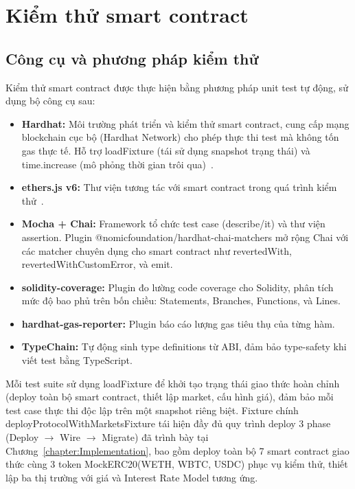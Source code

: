 \documentclass[../DoAn.tex]{subfiles}
\begin{document}
\section{Kiểm thử smart contract}


\subsection{Công cụ và phương pháp kiểm thử}


Kiểm thử smart contract được thực hiện bằng phương pháp unit test tự động, sử dụng bộ công cụ sau:

\begin{itemize}
  \item \textbf{Hardhat:} Môi trường phát triển và kiểm thử smart contract, cung cấp mạng blockchain cục bộ (Hardhat Network) cho phép thực thi test mà không tốn gas thực tế. Hỗ trợ loadFixture (tái sử dụng snapshot trạng thái) và time.increase (mô phỏng thời gian trôi qua)~\cite{HardhatDocs}.
  \item \textbf{ethers.js v6:} Thư viện tương tác với smart contract trong quá trình kiểm thử~\cite{EthersJsDocs}.
  \item \textbf{Mocha + Chai:} Framework tổ chức test case (describe/it) và thư viện assertion. Plugin @nomicfoundation/hardhat-chai-matchers mở rộng Chai với các matcher chuyên dụng cho smart contract như revertedWith, revertedWithCustomError, và emit.
  \item \textbf{solidity-coverage:} Plugin đo lường code coverage cho Solidity, phân tích mức độ bao phủ trên bốn chiều: Statements, Branches, Functions, và Lines.
  \item \textbf{hardhat-gas-reporter:} Plugin báo cáo lượng gas tiêu thụ của từng hàm.
  \item \textbf{TypeChain:} Tự động sinh type definitions từ ABI, đảm bảo type-safety khi viết test bằng TypeScript.
\end{itemize}


Mỗi test suite sử dụng loadFixture để khởi tạo trạng thái giao thức hoàn chỉnh (deploy toàn bộ smart contract, thiết lập market, cấu hình giá), đảm bảo mỗi test case thực thi độc lập trên một snapshot riêng biệt. Fixture chính deployProtocolWithMarketsFixture tái hiện đầy đủ quy trình deploy 3 phase (Deploy $\rightarrow$ Wire $\rightarrow$ Migrate) đã trình bày tại Chương~\ref{chapter:Implementation}, bao gồm deploy toàn bộ 7 smart contract giao thức cùng 3 token MockERC20(WETH, WBTC, USDC) phục vụ kiểm thử, thiết lập ba thị trường với giá và Interest Rate Model tương ứng.
\end{document}
